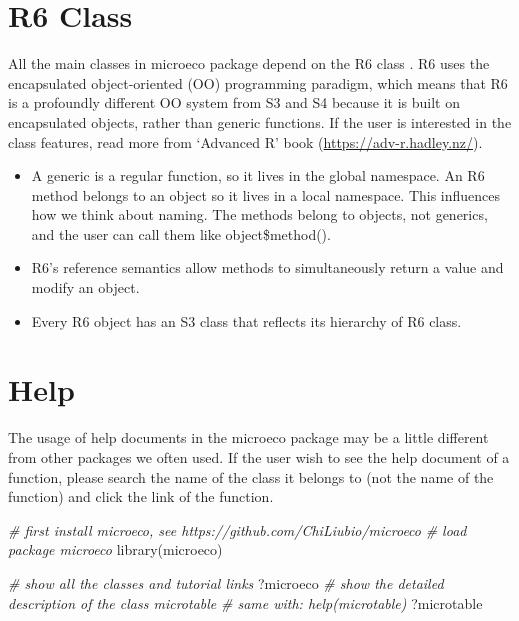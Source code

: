 \documentclass[
]{book}
\newenvironment{Shaded}{\begin{snugshade}}{\end{snugshade}}
\newcommand{\CommentTok}[1]{\textcolor[rgb]{0.56,0.35,0.01}{\textit{#1}}}
\newcommand{\FunctionTok}[1]{\textcolor[rgb]{0.00,0.00,0.00}{#1}}
\newcommand{\NormalTok}[1]{#1}
\begin{document}
\hypertarget{r6-class}{%
\section{R6 Class}\label{r6-class}}

All the main classes in microeco package depend on the R6 class \citep{R6_Winston}.
R6 uses the encapsulated object-oriented (OO) programming paradigm,
which means that R6 is a profoundly different OO system from S3 and S4 because it is built on encapsulated objects, rather than generic functions.
If the user is interested in the class features, read more from `Advanced R' book (\url{https://adv-r.hadley.nz/}).

\begin{itemize}
\item
  A generic is a regular function, so it lives in the global namespace. An R6 method belongs to an object so it lives in a local namespace.
  This influences how we think about naming. The methods belong to objects, not generics, and the user can call them like object\$method().
\item
  R6's reference semantics allow methods to simultaneously return a value and modify an object.
\item
  Every R6 object has an S3 class that reflects its hierarchy of R6 class.
\end{itemize}

\hypertarget{help}{%
\section{Help}\label{help}}

The usage of help documents in the microeco package may be a little different from other packages we often used.
If the user wish to see the help document of a function, please search the name of the class it belongs to (not the name of the function)
and click the link of the function.

\begin{Shaded}
\begin{Highlighting}[]
\CommentTok{\# first install microeco, see https://github.com/ChiLiubio/microeco}
\CommentTok{\# load package microeco}
\FunctionTok{library}\NormalTok{(microeco)}
\end{Highlighting}
\end{Shaded}

\begin{Shaded}
\begin{Highlighting}[]
\CommentTok{\# show all the classes and tutorial links}
\NormalTok{?microeco}
\CommentTok{\# show the detailed description of the class microtable}
\CommentTok{\# same with: help(microtable)}
\NormalTok{?microtable}
\end{Highlighting}
\end{Shaded}
\end{document}
